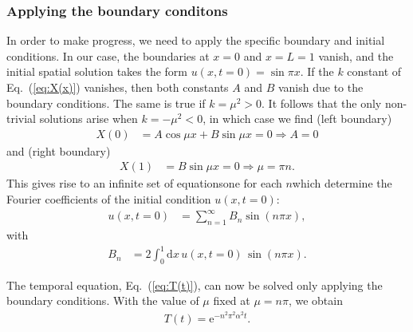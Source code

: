 \documentclass[a4paper, twocolumn]{article}
\newcommand{\eq} [1]{Eq.\ (\ref{eq:#1})}
\begin{document}
\subsubsection{Applying the boundary conditons}
In order to make progress, we need to apply the specific boundary and initial conditions. In our case, the boundaries at $x=0$ and $x=L=1$ vanish, and the initial spatial solution takes the form $u(x,t=0)=\sin \pi x$. If the $k$ constant of \eq{X(x)} vanishes, then  both constants $A$ and $B$ vanish due to the boundary conditions. The same is true if $k=\mu^2>0$. It follows that the only non-trivial solutions arise when $k=-\mu^2<0$, in which case we find (left boundary)
\begin{align}
X(0) &= A\cos \mu x + B\sin\mu x = 0 \Rightarrow A=0 \nonumber 
\end{align}
and (right boundary) 
\begin{align}
X(1) &= B\sin\mu x = 0 \Rightarrow \mu=\pi n. \nonumber 
\end{align}
This gives rise to an infinite set of equations\textemdash one for each $n$\textemdash which determine the Fourier coefficients of the initial condition $u(x,t=0)$:
\begin{align}
u(x,t=0) &= \sum_{n=1}^\infty B_n \sin (n\pi x),
\end{align}
with 
\begin{align}
B_n &= 2\int_0^1\mathrm{d}x\, u(x,t=0)\,\sin(n\pi x).
\end{align}

The temporal equation, \eq{T(t)}, can now be solved only applying the boundary conditions. With the value of $\mu$ fixed at $\mu=n\pi$, we obtain 
\begin{align}
T(t) = \mathrm{e}^{-n^2\pi^2\alpha^2 t}.
\end{align}
\end{document}
